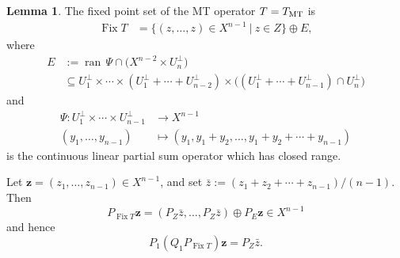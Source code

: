 \documentclass[11pt]{article}
\newcommand{\bz}{\ensuremath{\mathbf{z}}}
\newcommand{\menge}[2]{\big\{{#1}~\big |~{#2}\big\}}
\newcommand{\ran}{\ensuremath{{\operatorname{ran}}\,}}
\newcommand{\Fix}{\ensuremath{\operatorname{Fix}}}
\newcommand{\tmt}{\ensuremath{T_{\text{\scriptsize MT}}}}
\theoremstyle{definition}
\newtheorem{lemma}[theorem]{Lemma}
\providecommand{\ran}{\operatorname{ran}}
\providecommand{\ran}{\operatorname{ran}}
\begin{document}
{\begin{lemma}
\label{mtfixlemma}
The fixed point set of the MT operator $T=\tmt$ is 
\begin{align}
\label{e:210817e}
\Fix T &= \menge{(z,\ldots,z)\in X^{n-1}}{z\in Z} \oplus E,
\end{align}
where 
\begin{subequations}
\label{e:bloodyE}
\begin{align}
E &:= 
\ran\Psi \cap \big(X^{n-2}\times U_n^\perp)\\
&\subseteq 
U_1^\perp \times 
\cdots
\times (U_1^\perp+\cdots+U_{n-2}^\perp)
\times \big((U_1^\perp+\cdots+U_{n-1}^\perp)\cap U_n^\perp\big)
\end{align}
\end{subequations}
and 
\begin{subequations}
\label{e:bloodyPsi}
\begin{align}
\Psi\colon U_1^\perp \times \cdots \times U_{n-1}^\perp
&\to X^{n-1}\\
(y_1,\ldots,y_{n-1})&\mapsto 
(y_1,y_1+y_2,\ldots,y_1+y_2+\cdots+y_{n-1})
\end{align}
\end{subequations}
 is the continuous linear partial sum operator which has closed range. 

Let $\bz = (z_1,\ldots,z_{n-1})\in X^{n-1}$,
and set $\bar{z} := (z_1+z_2+\cdots+z_{n-1})/(n-1)$.
Then
\begin{equation}
\label{e:210817d}
P_{\Fix T}\bz = (P_Z\bar{z},\ldots,P_Z\bar{z}) \oplus P_E\bz \in X^{n-1}
\end{equation}
and hence 
\begin{equation}
\label{e:210817g}
P_1(Q_1P_{\Fix T})\bz = P_Z\bar{z}.
\end{equation}


\end{lemma}}
\end{document}
